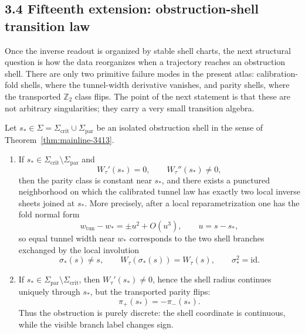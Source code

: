 \subsection*{3.4 Fifteenth extension: obstruction-shell transition law}
Once the inverse readout is organized by stable shell charts, the next structural question is how the data reorganizes when a trajectory reaches an obstruction shell. There are only two primitive failure modes in the present atlas: calibration-fold shells, where the tunnel-width derivative vanishes, and parity shells, where the transported $\mathbb Z_2$ class flips. The point of the next statement is that these are not arbitrary singularities; they carry a very small transition algebra.

\begin{theorem}
\label{thm:mainline-3414}
Let $s_\ast\in \Sigma=\Sigma_{\mathrm{crit}}\cup\Sigma_{\mathrm{par}}$ be an isolated obstruction shell in the sense of Theorem~\ref{thm:mainline-3413}.
\begin{enumerate}[label=(\roman*)]
  \item If $s_\ast\in \Sigma_{\mathrm{crit}}\setminus\Sigma_{\mathrm{par}}$ and
  \[
    W_\tau'(s_\ast)=0,
    \qquad
    W_\tau''(s_\ast)\neq 0,
  \]
  then the parity class is constant near $s_\ast$, and there exists a punctured neighborhood on which the calibrated tunnel law has exactly two local inverse sheets joined at $s_\ast$. More precisely, after a local reparametrization one has the fold normal form
  \[
    w_{\mathrm{tun}}-w_\ast = \pm u^2 + O(u^3),
    \qquad
    u=s-s_\ast,
  \]
  so equal tunnel width near $w_\ast$ corresponds to the two shell branches exchanged by the local involution
  \[
    \sigma_\ast(s)\neq s,
    \qquad
    W_\tau(\sigma_\ast(s))=W_\tau(s),
    \qquad
    \sigma_\ast^2=\mathrm{id}.
  \]

  \item If $s_\ast\in \Sigma_{\mathrm{par}}\setminus\Sigma_{\mathrm{crit}}$, then $W_\tau'(s_\ast)\neq 0$, hence the shell radius continues uniquely through $s_\ast$, but the transported parity flips:
  \[
    \pi_+(s_\ast)=-\pi_-(s_\ast).
  \]
  Thus the obstruction is purely discrete: the shell coordinate is continuous, while the visible branch label changes sign.


\end{enumerate}
\end{theorem}
